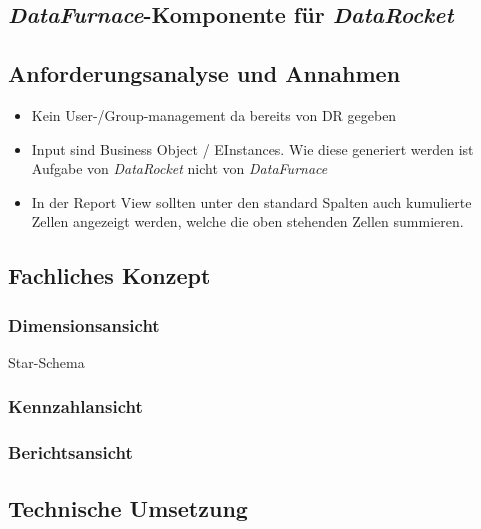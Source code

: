 \documentclass[
  language=german, %
  type=bachelor%
]{isthesis}
\begin{document}
\begin{content}
  \chapter{\textit{DataFurnace}-Komponente für \textit{DataRocket}}



  \section{Anforderungsanalyse und Annahmen}
  \begin{itemize}
    \item Kein User-/Group-management da bereits von DR gegeben
    \item Input sind Business Object / EInstances. Wie diese generiert werden
      ist Aufgabe von \textit{DataRocket} nicht von \textit{DataFurnace}
    \item In der Report View sollten unter den standard Spalten auch kumulierte
      Zellen angezeigt werden, welche die oben stehenden Zellen summieren.
  \end{itemize}

  \section{Fachliches Konzept}
  \subsection{Dimensionsansicht}
  Star-Schema
  \subsection{Kennzahlansicht}
  \subsection{Berichtsansicht}


  \section{Technische Umsetzung}


\end{content}
\end{document}
